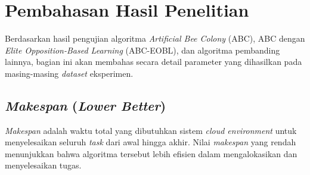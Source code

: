 \section{Pembahasan Hasil Penelitian}
Berdasarkan hasil pengujian algoritma \textit{Artificial Bee Colony} (ABC), ABC dengan \textit{Elite Opposition-Based Learning} (ABC-EOBL), dan algoritma pembanding lainnya, bagian ini akan membahas secara detail parameter yang dihasilkan pada masing-masing \textit{dataset} eksperimen.

\subsection{\textit{Makespan} (\textit{Lower Better})}
\textit{Makespan} adalah waktu total yang dibutuhkan sistem \textit{cloud environment} untuk menyelesaikan seluruh \textit{task} dari awal hingga akhir. Nilai \textit{makespan} yang rendah menunjukkan bahwa algoritma tersebut lebih efisien dalam mengalokasikan dan menyelesaikan tugas.

\newpage

